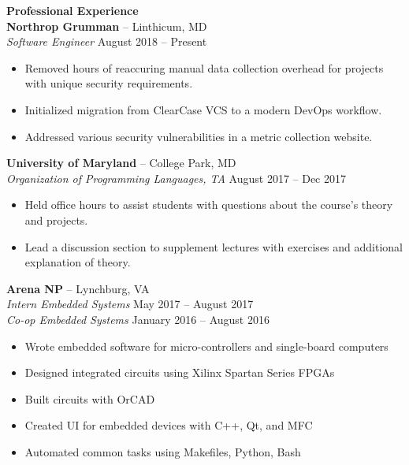 \documentclass[10pt]{article}
\begin{document}
\begin{textblock}{0.7}
\begin{itemize}
      \end{itemize}
    \textbf{\large Professional Experience} \\
      \textbf{Northrop Grumman} -- Linthicum, MD \\
      \textit{Software Engineer} \hfill August 2018 -- Present
      \begin{itemize}
        \setlength{\itemsep}{0pt}
        \item Removed hours of reaccuring manual data collection overhead for projects with unique security requirements.
        \item Initialized migration from ClearCase VCS to a modern DevOps workflow.
        \item Addressed various security vulnerabilities in a metric collection website.
      \end{itemize}
      \textbf{University of Maryland} -- College Park, MD \\
      \textit{Organization of Programming Languages, TA} \hfill August 2017 -- Dec 2017
      \begin{itemize}
        \setlength{\itemsep}{0pt}
        \item Held office hours to assist students with questions about the course's theory and projects.
        \item Lead a discussion section to supplement lectures with exercises and additional explanation of theory.
      \end{itemize}
      \textbf{Arena NP} -- Lynchburg, VA \\
      \textit{Intern Embedded Systems} \hfill May 2017 -- August 2017 \\
      \textit{Co-op Embedded Systems} \hfill January 2016 -- August 2016
      \begin{itemize}
        \setlength{\itemsep}{0pt}
        \item Wrote embedded software for micro-controllers and single-board computers
        \item Designed integrated circuits using Xilinx Spartan Series FPGAs
        \item Built circuits with OrCAD
        \item Created UI for embedded devices with C++, Qt, and MFC
        \item Automated common tasks using Makefiles, Python, Bash
      \end{itemize}
  \end{textblock}
\end{document}
